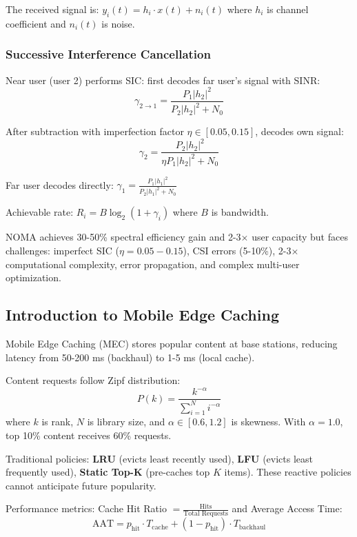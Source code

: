 \documentclass[12pt,a4paper]{article}
\begin{document}
The received signal is: $y_i(t) = h_i \cdot x(t) + n_i(t)$ where $h_i$ is channel coefficient and $n_i(t)$ is noise.

\subsubsection{Successive Interference Cancellation}

Near user (user 2) performs SIC: first decodes far user's signal with SINR:
\begin{equation}
\gamma_{2 \rightarrow 1} = \frac{P_1 |h_2|^2}{P_2 |h_2|^2 + N_0}
\end{equation}

After subtraction with imperfection factor $\eta \in [0.05, 0.15]$, decodes own signal:
\begin{equation}
\gamma_2 = \frac{P_2 |h_2|^2}{\eta P_1 |h_2|^2 + N_0}
\end{equation}

Far user decodes directly: $\gamma_1 = \frac{P_1 |h_1|^2}{P_2 |h_1|^2 + N_0}$

Achievable rate: $R_i = B \log_2(1 + \gamma_i)$ where $B$ is bandwidth.

NOMA achieves 30-50\% spectral efficiency gain and 2-3× user capacity but faces challenges: imperfect SIC ($\eta = 0.05-0.15$), CSI errors (5-10\%), 2-3× computational complexity, error propagation, and complex multi-user optimization.

\subsection{Introduction to Mobile Edge Caching}

Mobile Edge Caching (MEC) stores popular content at base stations, reducing latency from 50-200 ms (backhaul) to 1-5 ms (local cache).

Content requests follow Zipf distribution:
\begin{equation}
P(k) = \frac{k^{-\alpha}}{\sum_{i=1}^{N} i^{-\alpha}}
\end{equation}
where $k$ is rank, $N$ is library size, and $\alpha \in [0.6, 1.2]$ is skewness. With $\alpha = 1.0$, top 10\% content receives 60\% requests.

Traditional policies: \textbf{LRU} (evicts least recently used), \textbf{LFU} (evicts least frequently used), \textbf{Static Top-K} (pre-caches top $K$ items). These reactive policies cannot anticipate future popularity.

Performance metrics: Cache Hit Ratio $= \frac{\text{Hits}}{\text{Total Requests}}$ and Average Access Time:
\begin{equation}
\text{AAT} = p_{\text{hit}} \cdot T_{\text{cache}} + (1 - p_{\text{hit}}) \cdot T_{\text{backhaul}}
\end{equation}
\end{document}
